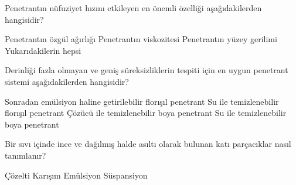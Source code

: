 \begin{question}[subtitle=]
  Penetrantın nüfuziyet hızını etkileyen en önemli özelliği aşağıdakilerden hangisidir?
  \begin{tasks}
    \task Penetrantın özgül ağırlığı
    \task Penetrantın viskozitesi \correct
    \task Penetrantın yüzey gerilimi
    \task Yukarıdakilerin hepsi
  \end{tasks}
\end{question}
\begin{solution}
	\correct
\end{solution}

\begin{question}[subtitle=]
  Derinliği fazla olmayan ve geniş süreksizliklerin tespiti için en uygun penetrant sistemi
aşağıdakilerden hangisidir?
  \begin{tasks}
    \task Sonradan emülsiyon haline getirilebilir florışıl penetrant \correct
    \task Su ile temizlenebilir florışıl penetrant
    \task Çözücü ile temizlenebilir boya penetrant
    \task Su ile temizlenebilir boya penetrant
  \end{tasks}
\end{question}
\begin{solution}
	\correct
\end{solution}

\begin{question}[subtitle=]
  Bir sıvı içinde ince ve dağılmış halde asıltı olarak bulunan katı parçacıklar nasıl tanımlanır?
  \begin{tasks}
    \task Çözelti
    \task Karışım
    \task Emülsiyon
    \task Süspansiyon \correct
  \end{tasks}
\end{question}
\begin{solution}
	\correct
\end{solution}



